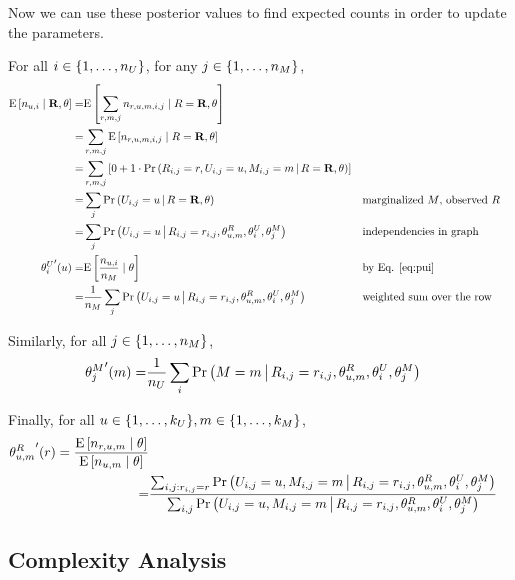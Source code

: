 \documentclass{article}
\begin{document}
Now we can use these posterior values to find expected counts in order
to update the parameters.

For all $i \in {\left\{ 1, \dots, n_U \right\}}$, for any $j \in {\left\{ 1, \dots, n_M \right\}}$,
\begin{align}
  {\textrm{E} \left[ n_{u,i} \mid {\bf R}, \theta \right]}
  =& {\textrm{E} \left[  \sum_{r,m,j} n_{r,u,m,i,j}  \mid R = {\bf R}, \theta \right]} \\
  =& \sum_{r,m,j} {\textrm{E} \left[  n_{r,u,m,i,j}  \mid R = {\bf R}, \theta \right]} \\
  =& \sum_{r,m,j} \left[
    0 + 1 \cdot {{\Pr \left(   R_{i,j} = r, U_{i,j} = u, M_{i,j} = m  \,\middle|\, R = {\bf R}, \theta  \right)}}
  \right] \\
  =& \sum_j {{\Pr \left(  U_{i,j} = u \,\middle|\, R = {\bf R}, \theta  \right)}}
  && \text{marginalized $M$, observed $R$} \\
  =& \sum_j {{\Pr \left(  U_{i,j} = u \,\middle|\, R_{i,j} = r_{i,j}, \theta^R_{u,m},
    \theta^U_i, \theta^M_j  \right)}}
  && \text{independencies in graph} \\
  {\theta^U_i}'(u)
  =& {\textrm{E} \left[  \frac{ n_{u,i}}{ n_M }  \mid \theta \right]} && \text{by Eq. \ref{eq:pui}} \\
  =& \frac{1}{n_M} \sum_j {{\Pr \left(  U_{i,j} = u \,\middle|\,  R_{i,j} = r_{i,j}, \theta^R_{u,m},
    \theta^U_i, \theta^M_j   \right)}}
  && \text{weighted sum over the row}
\end{align}

Similarly, for all $j \in {\left\{ 1, \dots, n_M \right\}}$,
\begin{align}
  {\theta^M_j}'(m) =&
  \frac{1}{n_U} \sum_i {{\Pr \left(  M = m \,\middle|\, 
    R_{i,j} = r_{i,j}, \theta^R_{u,m}, \theta^U_i, \theta^M_j  \right)}}
\end{align}

Finally, for all $u \in {\left\{ 1, \dots, k_U \right\}}, m \in {\left\{ 1, \dots, k_M \right\}}$,
\begin{align}
  {\theta^R_{u,m}}'(r)
  = \frac{ {\textrm{E} \left[ n_{r,u,m}  \mid \theta \right]} }{ {\textrm{E} \left[ n_{u,m} \mid \theta \right]} } \\
  =& \frac{\sum_{i,j: r_{i,j} = r} {{\Pr \left(  U_{i,j} = u, M_{i,j} = m \,\middle|\, 
      R_{i,j} = r_{i,j}, \theta^R_{u,m}, \theta^U_i, \theta^M_j  \right)}}
  }{ \sum_{i,j} {{\Pr \left(  U_{i,j} = u, M_{i,j} = m \,\middle|\, 
      R_{i,j} = r_{i,j}, \theta^R_{u,m}, \theta^U_i, \theta^M_j  \right)}} } \\
\end{align}

\subsection{Complexity Analysis}
\end{document}
